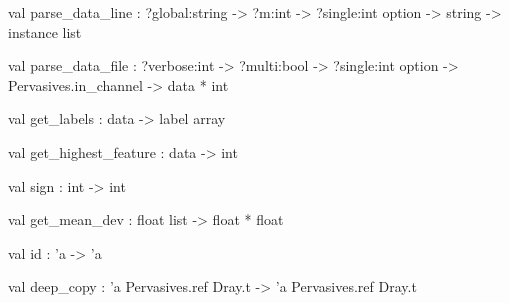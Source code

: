 \documentclass[11pt]{article}
\begin{document}
\label{val:Util.parse-underscoredata-underscoreline}\begin{ocamldoccode}
val parse_data_line :
  ?global:string ->
  ?m:int -> ?single:int option -> string -> instance list
\end{ocamldoccode}




\label{val:Util.parse-underscoredata-underscorefile}\begin{ocamldoccode}
val parse_data_file :
  ?verbose:int ->
  ?multi:bool -> ?single:int option -> Pervasives.in_channel -> data * int
\end{ocamldoccode}




\label{val:Util.get-underscorelabels}\begin{ocamldoccode}
val get_labels : data -> label array
\end{ocamldoccode}




\label{val:Util.get-underscorehighest-underscorefeature}\begin{ocamldoccode}
val get_highest_feature : data -> int
\end{ocamldoccode}




\label{val:Util.sign}\begin{ocamldoccode}
val sign : int -> int
\end{ocamldoccode}




\label{val:Util.get-underscoremean-underscoredev}\begin{ocamldoccode}
val get_mean_dev : float list -> float * float
\end{ocamldoccode}




\label{val:Util.id}\begin{ocamldoccode}
val id : 'a -> 'a
\end{ocamldoccode}




\label{val:Util.deep-underscorecopy}\begin{ocamldoccode}
val deep_copy : 'a Pervasives.ref Dray.t -> 'a Pervasives.ref Dray.t
\end{ocamldoccode}
\end{document}
